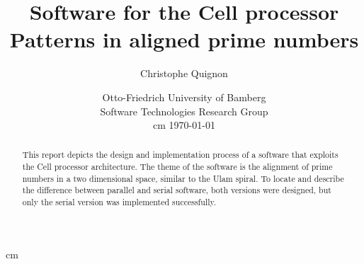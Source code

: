 \documentclass[a4paper]{article}
\begin{document}
\begin{titlepage}


\title{%
	\Huge Software for the Cell processor\bigskip\\ \Large Patterns in aligned prime numbers\\}
\author{Christophe Quignon}
\date{Otto-Friedrich University of Bamberg\\
Software Technologies Research Group\\
 cm	
\today}

\maketitle
{} cm
\begin{abstract}
This report depicts the design and implementation process of a software that exploits the Cell processor architecture. The theme of the software is the alignment of prime numbers in a two dimensional space, similar to the Ulam spiral. To locate and describe the difference between parallel and serial software, both versions were designed, but only the serial version was implemented successfully.
\end{abstract}
\thispagestyle{empty}
\newpage
\tableofcontents
{}
\newpage
\listoffigures
\newpage
\end{titlepage}






%

\newpage



   
\end{document}
